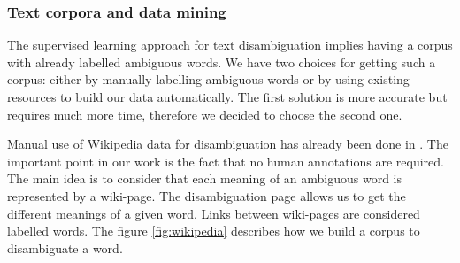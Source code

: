 \documentclass[11pt,a4paper]{article}
\begin{document}
\subsubsection{Text corpora and data mining}

The supervised learning approach for text disambiguation implies having a corpus with already labelled ambiguous words. We have two choices for getting such a corpus: either by manually labelling ambiguous words or by using existing resources to build our data automatically. The first solution is more accurate but requires much more time, therefore we decided to choose the second one.

Manual use of Wikipedia data for disambiguation has already been done in \cite{wikipedia}. The important point in our work is the fact that no human annotations are required. The main idea is to consider that each meaning of an ambiguous word is represented by a wiki-page. The disambiguation page allows us to get the different meanings of a given word. Links between wiki-pages are considered labelled words. The figure \ref{fig:wikipedia} describes how we build a corpus to disambiguate a word.
\end{document}
